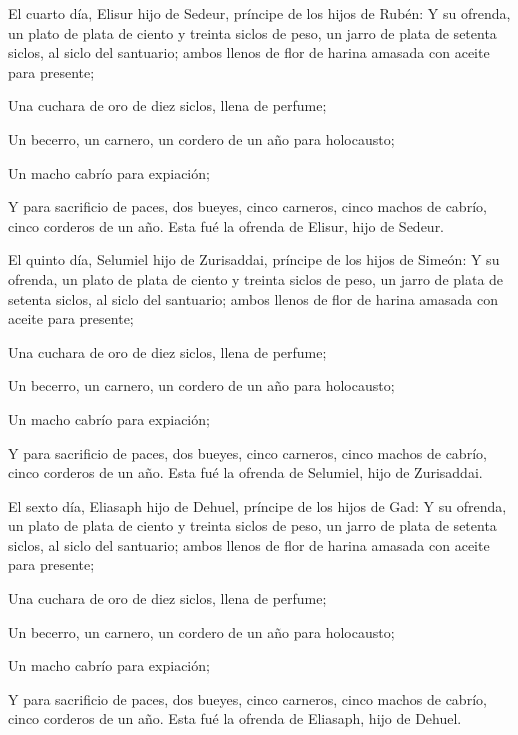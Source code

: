  El cuarto día, Elisur hijo de Sedeur, príncipe de los
hijos de Rubén:  Y su ofrenda, un plato de plata de
ciento y treinta siclos de peso, un jarro de plata de setenta siclos, al
siclo del santuario; ambos llenos de flor de harina amasada con aceite
para presente;

 Una cuchara de oro de diez siclos, llena de perfume;

 Un becerro, un carnero, un cordero de un año para
holocausto;

 Un macho cabrío para expiación;

 Y para sacrificio de paces, dos bueyes, cinco carneros,
cinco machos de cabrío, cinco corderos de un año. Esta fué la ofrenda de
Elisur, hijo de Sedeur.

 El quinto día, Selumiel hijo de Zurisaddai, príncipe de
los hijos de Simeón:  Y su ofrenda, un plato de plata de
ciento y treinta siclos de peso, un jarro de plata de setenta siclos, al
siclo del santuario; ambos llenos de flor de harina amasada con aceite
para presente;

 Una cuchara de oro de diez siclos, llena de perfume;

 Un becerro, un carnero, un cordero de un año para
holocausto;

 Un macho cabrío para expiación;

 Y para sacrificio de paces, dos bueyes, cinco carneros,
cinco machos de cabrío, cinco corderos de un año. Esta fué la ofrenda de
Selumiel, hijo de Zurisaddai.

 El sexto día, Eliasaph hijo de Dehuel, príncipe de los
hijos de Gad:  Y su ofrenda, un plato de plata de ciento
y treinta siclos de peso, un jarro de plata de setenta siclos, al siclo
del santuario; ambos llenos de flor de harina amasada con aceite para
presente;

 Una cuchara de oro de diez siclos, llena de perfume;

 Un becerro, un carnero, un cordero de un año para
holocausto;

 Un macho cabrío para expiación;

 Y para sacrificio de paces, dos bueyes, cinco carneros,
cinco machos de cabrío, cinco corderos de un año. Esta fué la ofrenda de
Eliasaph, hijo de Dehuel.

